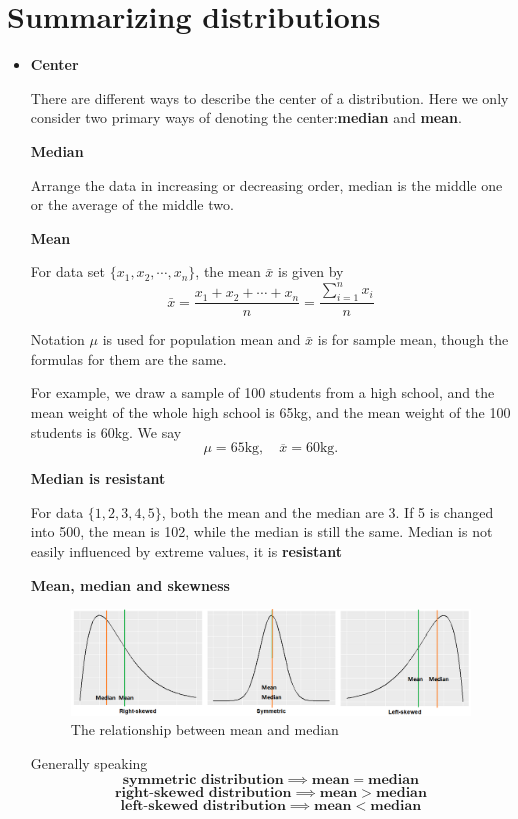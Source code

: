\documentclass[a4paper, 12pt,twoside]{book}
\begin{document}
\section{Summarizing distributions}

\begin{itemize}


\item \textbf{Center}\vspace{0.3cm}

There are different ways to describe the center of a distribution. Here we only consider two primary ways of denoting the center:\textbf{median} and \textbf{mean}.\vspace{0.6cm}

 \textbf{Median}\vspace{0.3cm}
 
 Arrange the data in increasing or decreasing order, median is the middle one or the average of the middle two. \vspace{0.6cm}
 
 \textbf{Mean}\vspace{0.3cm}
 
 For data set $\{x_1, x_2, \cdots, x_n\}$, the mean $\bar{x}$ is given by 
 $$\bar{x} = \frac{x_1+x_2+\cdots+x_n}{n}
           = \frac{\sum_{i=1}^{n}x_i}{n} $$

\colorbox{babypink}{\parbox{0.9\textwidth}{Notation $\mu$ is used for population mean and  $\bar{x}$ is for sample mean, though the formulas for them are the same. }}

For example, we draw a sample of 100 students from a high school, and the mean weight of the whole high school is 65kg,  and the mean weight of the 100 students is 60kg. We say
$$\mu = 65 \text{kg}, \quad \overline{x} = 60 \text{kg}.$$

\textbf{Median is resistant}\vspace{0.3cm}

For data $\{1, 2, 3, 4, 5\}$, both the mean and the median are 3. If 5 is changed into 500, the mean is 102, while the median is still the same. Median is not easily influenced by extreme values, it is \textbf{resistant}\vspace{0.6cm}

\textbf{Mean, median and skewness}
\begin{figure}[H]
\centering
\includegraphics[scale=0.3]{MeanMedian.png}
\caption{The relationship between mean and median}
\label{MeanMedian}
\end{figure}
Generally speaking
 $$\textbf{symmetric distribution} \implies \textbf{mean} = \textbf{median}$$ 
  $$\textbf{right-skewed distribution}\implies \textbf{mean} > \textbf{median}$$
   $$\textbf{left-skewed distribution}\implies \textbf{mean} < \textbf{median}$$


\end{itemize}
\end{document}
